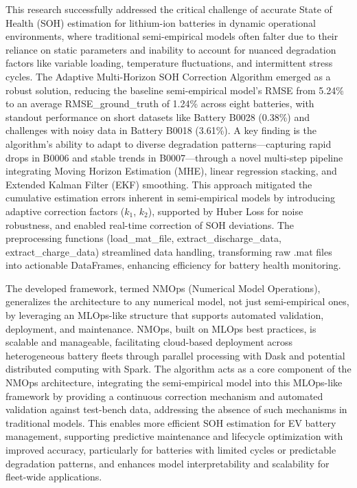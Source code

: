 This research successfully addressed the critical challenge of accurate State of Health (SOH) estimation for lithium-ion batteries in dynamic operational environments, where traditional semi-empirical models often falter due to their reliance on static parameters and inability to account for nuanced degradation factors like variable loading, temperature fluctuations, and intermittent stress cycles. The Adaptive Multi-Horizon SOH Correction Algorithm emerged as a robust solution, reducing the baseline semi-empirical model’s RMSE from 5.24\% to an average RMSE\_ground\_truth of 1.24\% across eight batteries, with standout performance on short datasets like Battery B0028 (0.38\%) and challenges with noisy data in Battery B0018 (3.61\%). A key finding is the algorithm’s ability to adapt to diverse degradation patterns—capturing rapid drops in B0006 and stable trends in B0007—through a novel multi-step pipeline integrating Moving Horizon Estimation (MHE), linear regression stacking, and Extended Kalman Filter (EKF) smoothing. This approach mitigated the cumulative estimation errors inherent in semi-empirical models by introducing adaptive correction factors ($k_1$, $k_2$), supported by Huber Loss for noise robustness, and enabled real-time correction of SOH deviations. The preprocessing functions (load\_mat\_file, extract\_discharge\_data, extract\_charge\_data) streamlined data handling, transforming raw .mat files into actionable DataFrames, enhancing efficiency for battery health monitoring.

The developed framework, termed NMOps (Numerical Model Operations), generalizes the architecture to any numerical model, not just semi-empirical ones, by leveraging an MLOps-like structure that supports automated validation, deployment, and maintenance. NMOps, built on MLOps best practices, is scalable and manageable, facilitating cloud-based deployment across heterogeneous battery fleets through parallel processing with Dask and potential distributed computing with Spark. The algorithm acts as a core component of the NMOps architecture, integrating the semi-empirical model into this MLOps-like framework by providing a continuous correction mechanism and automated validation against test-bench data, addressing the absence of such mechanisms in traditional models. This enables more efficient SOH estimation for EV battery management, supporting predictive maintenance and lifecycle optimization with improved accuracy, particularly for batteries with limited cycles or predictable degradation patterns, and enhances model interpretability and scalability for fleet-wide applications.

